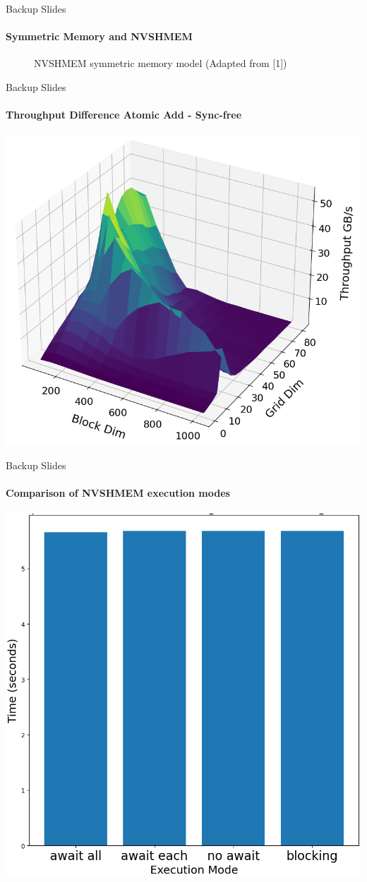 \begin{frame}{Backup Slides}
\framesubtitle{Symmetric Memory and NVSHMEM}

\begin{figure}
    \centering
    \begin{tikzpicture}[x=1pt,y=0.9pt,yscale=-0.55,xscale=0.65]
    
    \end{tikzpicture}
    \caption{NVSHMEM symmetric memory model (Adapted from [1])}
    \label{fig:my_label}
\end{figure}

\end{frame}



\begin{frame}{Backup Slides}
\framesubtitle{Throughput Difference Atomic Add - Sync-free}
\vspace{-4.0mm}
\begin{center}
\includegraphics[width=0.45\linewidth]{images/scan_speed_diff.png}
\end{center}
\end{frame}

\begin{frame}{Backup Slides}
\framesubtitle{Comparison of NVSHMEM execution modes}
\vspace{-2.0mm}
\begin{center}
\includegraphics[width=0.38\linewidth]{images/blocking_nonblocking_barchart.png}
\end{center}
\end{frame}




    
